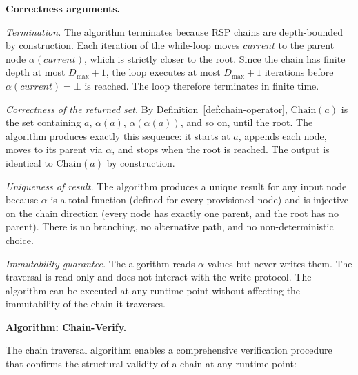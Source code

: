 \medskip
\noindent\textbf{Correctness arguments.}

\textit{Termination.} The algorithm terminates because RSP chains are depth-bounded by construction. Each iteration of the while-loop moves $current$ to the parent node $\alpha(current)$, which is strictly closer to the root. Since the chain has finite depth at most $D_{\max} + 1$, the loop executes at most $D_{\max} + 1$ iterations before $\alpha(current) = \bot$ is reached. The loop therefore terminates in finite time.

\textit{Correctness of the returned set.} By Definition~\ref{def:chain-operator}, $\mathrm{Chain}(a)$ is the set containing $a$, $\alpha(a)$, $\alpha(\alpha(a))$, and so on, until the root. The algorithm produces exactly this sequence: it starts at $a$, appends each node, moves to its parent via $\alpha$, and stops when the root is reached. The output is identical to $\mathrm{Chain}(a)$ by construction.

\textit{Uniqueness of result.} The algorithm produces a unique result for any input node because $\alpha$ is a total function (defined for every provisioned node) and is injective on the chain direction (every node has exactly one parent, and the root has no parent). There is no branching, no alternative path, and no non-deterministic choice.

\textit{Immutability guarantee.} The algorithm reads $\alpha$ values but never writes them. The traversal is read-only and does not interact with the write protocol. The algorithm can be executed at any runtime point without affecting the immutability of the chain it traverses.

\medskip
\noindent\textbf{Algorithm: Chain-Verify.}

The chain traversal algorithm enables a comprehensive verification procedure that confirms the structural validity of a chain at any runtime point:

